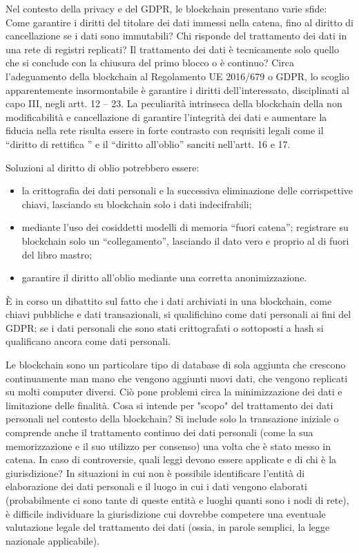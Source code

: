 Nel contesto della privacy e del GDPR, le blockchain presentano varie
sfide: Come garantire i diritti del titolare dei dati immessi nella catena,
fino al diritto di cancellazione se i dati sono immutabili? Chi risponde
del trattamento dei dati in una rete di registri replicati? Il trattamento
dei dati è tecnicamente solo quello che si conclude con la chiusura del
primo blocco o è continuo?
Circa l’adeguamento della blockchain al Regolamento UE 2016/679 o
GDPR, lo scoglio apparentemente insormontabile è garantire i diritti
dell’interessato, disciplinati al capo III, negli artt. 12 – 23. La peculiarità intrinseca della blockchain della non modificabilità e
cancellazione di garantire l'integrità dei dati e aumentare la fiducia
nella rete risulta essere in forte contrasto con requisiti legali come
il “diritto di rettifica ” e il “diritto all’oblio” sanciti nell’artt. 16 e 17.

Soluzioni al diritto di oblio potrebbero essere:
\begin{itemize}
    \item la crittografia dei dati personali e la successiva eliminazione delle
corrispettive chiavi, lasciando su blockchain solo i dati indecifrabili;
    \item mediante l’uso dei cosiddetti modelli di memoria “fuori catena”;
registrare su blockchain solo un “collegamento”, lasciando il dato
vero e proprio al di fuori del libro mastro;
    \item garantire il diritto all’oblio mediante una corretta anonimizzazione.
\end{itemize}

È in corso un dibattito sul fatto che i dati archiviati in una blockchain, come chiavi pubbliche e dati
transazionali, si qualifichino come dati personali ai fini del GDPR; se i dati personali che sono stati crittografati o sottoposti a hash si
qualificano ancora come dati personali.

Le blockchain sono un particolare tipo di database di sola aggiunta che
crescono continuamente man mano che vengono aggiunti nuovi dati,
che vengono replicati su molti computer diversi. Ciò pone problemi
circa la minimizzazione dei dati e limitazione delle finalità. Cosa si intende per "scopo" del trattamento dei dati personali nel
contesto della blockchain? Si include solo la transazione iniziale o
comprende anche il trattamento continuo dei dati personali (come
la sua memorizzazione e il suo utilizzo per consenso) una volta che
è stato messo in catena. In caso di controversie, quali leggi devono essere applicate e di chi è la
giurisdizione? In situazioni in cui non è possibile identificare l’entità di
elaborazione dei dati personali e il luogo in cui i dati vengono elaborati
(probabilmente ci sono tante di queste entità e luoghi quanti sono i
nodi di rete), è difficile individuare la giurisdizione cui dovrebbe
competere una eventuale valutazione legale del trattamento dei dati
(ossia, in parole semplici, la legge nazionale applicabile).

